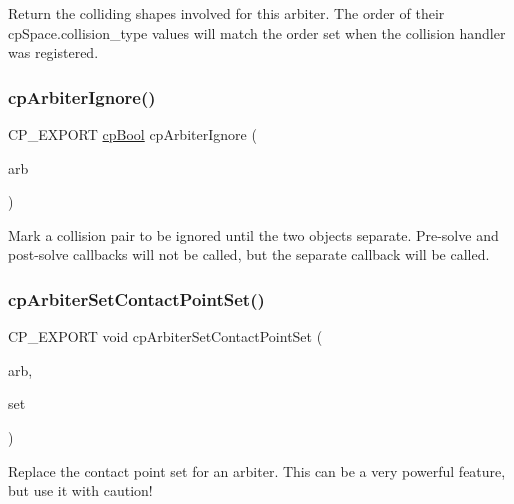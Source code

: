 Return the colliding shapes involved for this arbiter. The order of their cp\+Space.\+collision\+\_\+type values will match the order set when the collision handler was registered. \mbox{\label{group__cpArbiter_ga7a643cd465bdb61b2f686fdf3558b263}} 
\subsubsection{\texorpdfstring{cp\+Arbiter\+Ignore()}{cpArbiterIgnore()}}
{\footnotesize\ttfamily C\+P\+\_\+\+E\+X\+P\+O\+RT \hyperlink{group__basicTypes_gabc5e752c48f3449ca26ef413ecbd647e}{cp\+Bool} cp\+Arbiter\+Ignore (\begin{DoxyParamCaption}\item[{\hyperlink{structcpArbiter}{cp\+Arbiter} $\ast$}]{arb }\end{DoxyParamCaption})}

Mark a collision pair to be ignored until the two objects separate. Pre-\/solve and post-\/solve callbacks will not be called, but the separate callback will be called. \mbox{\label{group__cpArbiter_ga2a68f589f58dbae29de18cebee3de02d}} 
\subsubsection{\texorpdfstring{cp\+Arbiter\+Set\+Contact\+Point\+Set()}{cpArbiterSetContactPointSet()}}
{\footnotesize\ttfamily C\+P\+\_\+\+E\+X\+P\+O\+RT void cp\+Arbiter\+Set\+Contact\+Point\+Set (\begin{DoxyParamCaption}\item[{\hyperlink{structcpArbiter}{cp\+Arbiter} $\ast$}]{arb,  }\item[{\hyperlink{structcpContactPointSet}{cp\+Contact\+Point\+Set} $\ast$}]{set }\end{DoxyParamCaption})}

Replace the contact point set for an arbiter. This can be a very powerful feature, but use it with caution! \mbox{\label{group__cpArbiter_gafb92e7ea05fb11021ce3f01ff4baa067}} 
